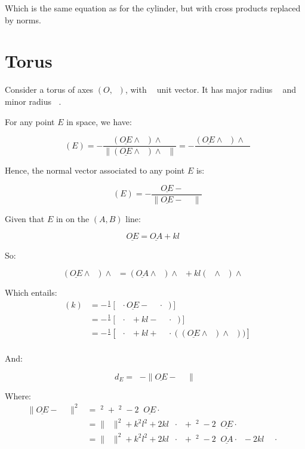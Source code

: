 \documentclass[10pt,a4paper]{article}
\newcommand{\ud}[1]{\underline{#1}}
\DeclareMathOperator{\cross}{\wedge}
\DeclareMathOperator{\OA}{\ud{OA}}
\DeclareMathOperator{\z}{\ud{z}}
\DeclareMathOperator{\e}{\ud{e}}
\DeclareMathOperator{\n}{\ud{n}}
\DeclareMathOperator{\en}{\ud{e}\cdot\ud{n}}
\DeclareMathOperator{\OEz}{\|\ud{OE} \cross \z\|}
\DeclareMathOperator{\OEn}{\|\ud{OE}\|}
\DeclareMathOperator{\ra}{r_{a}}
\DeclareMathOperator{\ea}{\ud{e}_{a}}
\DeclareMathOperator{\rb}{r_{b}}
\DeclareMathOperator{\OEa}{\|\ud{OE} \cross \ra\ea\|}
\begin{document}
Which is the same equation as for the cylinder, but with cross products
replaced by norms.


\newpage
\section{Torus}

Consider a torus of axes $(O, \z)$, with $\z$  unit vector.
It has major radius $\ra$ and minor radius $\rb$.

For any point $E$ in space, we have:

$$
    \ea(E) = - \frac{(\ud{OE} \cross  \z) \cross \z}{
    \|(\ud{OE} \cross  \z) \cross \z\|
}
    = - \frac{(\ud{OE} \cross  \z) \cross \z}{\OEz}
$$

Hence, the  normal vector associated to any point $E$ is:

$$
\n(E) = - \frac{\ud{OE} - \ra\ea}{\|\ud{OE} - \ra\ea\|}
$$

Given that $E$ in on the $(A, B)$ line:

$$
\ud{OE} = \ud{OA} + kl\e
$$

So:

$$
(\ud{OE} \cross \z) \cross \z
= (\ud{OA} \cross \z) \cross \z + kl( \e \cross \z )\cross \z
$$

Which entails:
$$
\begin{array}{ll}
    \en(k)
    & = - \frac{1}{\OEa}\left[ \e \cdot \ud{OE} - \ra \e \cdot \ea)\right]\\
    & = - \frac{1}{\OEa}\left[ \e \cdot \OA + kl - \ra \e \cdot \ea)\right]\\
    & = - \frac{1}{\OEa}\left[ 
    \e \cdot \OA + kl
    + \frac{\ra}{\OEz} \e \cdot \left((\ud{OE} \cross \z) \cross \z\right))
    \right]\\
\end{array}
$$

And:

$$
d_E = \rb - \|\ud{OE} - \ra\ea\|
$$

Where:
$$
\begin{array}{ll}
    \|\ud{OE} - \ra\ea\|^2
    & = \OEn^2 + \ra^2 - 2\ra\ud{OE}\cdot\ea\\
    & = \|\OA\|^2 + k^2l^2 + 2kl\OA\cdot\e + \ra^2 - 2\ra\ud{OE}\cdot\ea\\
    & = \|\OA\|^2 + k^2l^2 + 2kl\OA\cdot\e + \ra^2
    - 2\ra\ud{OA}\cdot\ea - 2kl\ra\e\cdot\ea\\
\end{array}
$$
\end{document}
